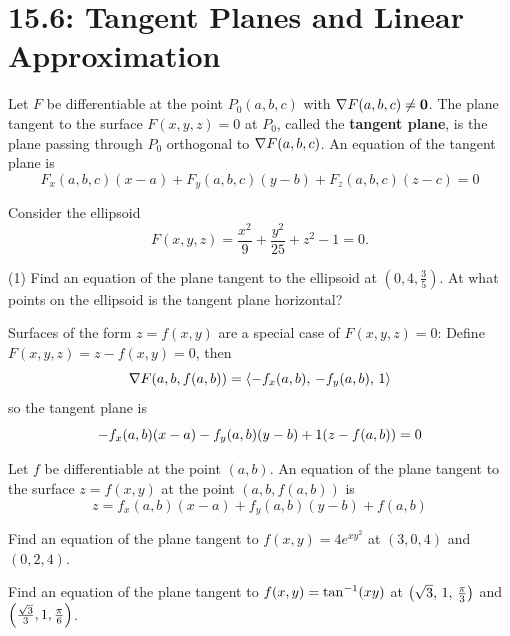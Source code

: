 \documentclass[mathNotesPreamble]{subfiles}
\begin{document}
\section{15.6: Tangent Planes and Linear Approximation}

  \begin{defn*}[Equation of the Tangent Plane for $F(x,y,z)=0$]
    Let $F$ be differentiable at the point $P_0(a,b,c)$ with $\nabla F(a,b,c)\neq \mathbf{0}$. The plane tangent to the surface $F(x,y,z)=0$ at $P_0$, called the \textbf{tangent plane}, is the plane passing through $P_0$ orthogonal to $\nabla F(a,b,c)$. An equation of the tangent plane is
      \[F_x(a,b,c)(x-a)+F_y(a,b,c)(y-b)+F_z(a,b,c)(z-c)=0\]
  \end{defn*}

  \begin{ex*}
    Consider the ellipsoid 
      \[F(x,y,z)= \frac{x^2}{9}+\frac{y^2}{25}+z^2-1=0.\]
    \begin{tasks}[after-item-skip=\stretch{1}](1)
      \task Find an equation of the plane tangent to the ellipsoid at $(0,4, \frac{3}{5})$.
      \task At what points on the ellipsoid is the tangent plane horizontal?
    \end{tasks}
  \end{ex*}
  \pagebreak

  Surfaces of the form $z=f(x,y)$ are a special case of $F(x,y,z)=0$: Define $F(x,y,z)=z-f(x,y)=0$, then
    \[\nabla F{\left(a,b,f(a,b)\right)}={\left\langle -f_x(a,b),\,-f_y(a,b),\,1 \right\rangle}\]
  so the tangent plane is
    \[-f_x(a,b)(x-a)-f_y(a,b)(y-b)+1{\left(z-f(a,b)\right)}=0\]
  \begin{thmBox*}[Tangent Plane for $z=f(x,y)$]
    Let $f$ be differentiable at the point $(a,b)$. An equation of the plane tangent to the surface $z=f(x,y)$ at the point $(a,b,f(a,b))$ is
      \[z=f_x(a,b)(x-a)+f_y(a,b)(y-b)+f(a,b)\]
  \end{thmBox*}

  \begin{ex*}
    Find an equation of the plane tangent to $f(x,y)=4e^{xy^2}$ at $(3,0,4)$ and $(0,2,4)$.
  \end{ex*}
  \pagebreak

  \begin{ex*}
    Find an equation of the plane tangent to $f(x,y)=\tan^{-1}(xy)$ at ${\left(\sqrt{3},\,1,\,\frac{\pi}{3}\right)}$ and ${\left(\frac{\sqrt{3}}{3},1,\frac{\pi}{6}\right)}$.
  \end{ex*}
\end{document}
